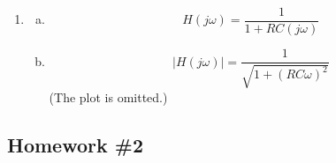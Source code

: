 \documentclass{article}
\begin{document}
\begin{enumerate}
            \item 
            \begin{enumerate}[(a)]
                \item \[
                    H(j\omega) = \frac{1}{1 + RC(j\omega)}
                \]
                \item \[
                    \left\vert H(j\omega) \right\vert = \frac{1}{\sqrt{1 + (RC\omega)^2}} 
                \]
                (The plot is omitted.)
            \end{enumerate}	
        \end{enumerate}
        \newpage
    
    \subsection*{Homework \#2}
\end{document}

